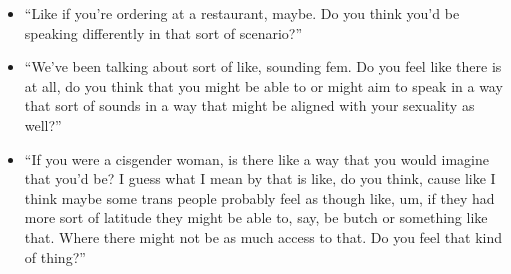 \documentclass[12pt,twoside]{reedthesis}
\begin{document}
\begin{itemize}
 \item ``Like if you're ordering at a restaurant, maybe. Do you think you'd be speaking differently in that sort of scenario?''
 \item ``We've been talking about sort of like, sounding fem. Do you feel like there is at all, do you think that you might be able to or might aim to speak in a way that sort of sounds in a way that might be aligned with your sexuality as well?''
 \item ``If you were a cisgender woman, is there like a way that you would imagine that you'd be? I guess what I mean by that is like, do you think, cause like I think maybe some trans people probably feel as though like, um, if they had more sort of latitude they might be able to, say, be butch or something like that. Where there might not be as much access to that. Do you feel that kind of thing?''
\end{itemize}
\end{document}
